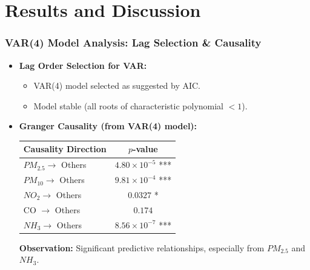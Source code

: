 \documentclass[svgnames, 12pt]{beamer}
\begin{document}
\section{Results and Discussion}
\begin{frame}
    \frametitle{VAR(4) Model Analysis: Lag Selection \& Causality}
    \begin{itemize}
        \item \textbf{Lag Order Selection for VAR:}
            \begin{itemize}
                \item VAR(4) model selected as suggested by AIC.
                \item Model stable (all roots of characteristic polynomial $<1$).
            \end{itemize}
        \item \textbf{Granger Causality (from VAR(4) model):}
            \begin{center}
            \footnotesize
            \begin{tabular}{lc}
                \toprule
                Causality Direction & $p$-value \\
                \midrule
                $PM_{2.5} \rightarrow$ Others & $4.80 \times 10^{-5}$ *** \\
                $PM_{10} \rightarrow$ Others & $9.81 \times 10^{-4}$ *** \\
                $NO_{2} \rightarrow$ Others & $0.0327$ * \\
                CO $\rightarrow$ Others & $0.174$ \\
                $NH_{3} \rightarrow$ Others & $8.56 \times 10^{-7}$ *** \\
                \bottomrule
            \end{tabular}
            \end{center}
            \vspace{0.2cm}
            \textbf{Observation:} Significant predictive relationships, especially from $PM_{2.5}$ and $NH_3$.
    \end{itemize}
\end{frame}
\end{document}
